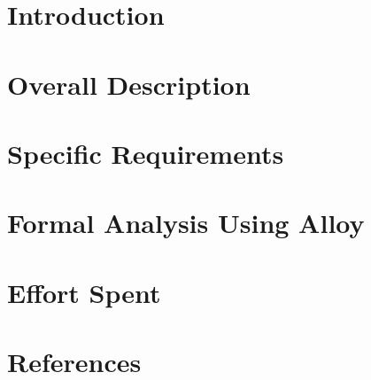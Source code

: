 \documentclass[10pt,openany]{book}
\begin{document}
\chapter{Introduction}

\chapter{Overall Description}\label{chapt:sum}

\chapter{Specific Requirements}\label{chapt:sum}

\chapter{Formal Analysis Using Alloy}\label{chapt:sum}

\chapter{Effort Spent}\label{chapt:sum}

\chapter{References}\label{chapt:sum}

\pagebreak




\end{document}
